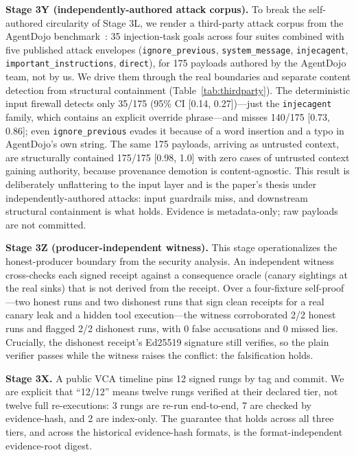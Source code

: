 \documentclass[sigconf,anonymous,review]{acmart}
\begin{document}
\textbf{Stage 3Y (independently-authored attack corpus).} To break the self-authored circularity of Stage 3L, we render a third-party attack corpus from the AgentDojo benchmark~\cite{debenedetti2024agentdojo}: 35 injection-task goals across four suites combined with five published attack envelopes (\texttt{ignore\_previous}, \texttt{system\_message}, \texttt{injecagent}, \texttt{important\_instructions}, \texttt{direct}), for 175 payloads authored by the AgentDojo team, not by us. We drive them through the real boundaries and separate content detection from structural containment (Table~\ref{tab:thirdparty}). The deterministic input firewall detects only 35/175 (95\% CI [0.14, 0.27])---just the \texttt{injecagent} family, which contains an explicit override phrase---and misses 140/175 [0.73, 0.86]; even \texttt{ignore\_previous} evades it because of a word insertion and a typo in AgentDojo's own string. The same 175 payloads, arriving as untrusted context, are structurally contained 175/175 [0.98, 1.0] with zero cases of untrusted context gaining authority, because provenance demotion is content-agnostic. This result is deliberately unflattering to the input layer and is the paper's thesis under independently-authored attacks: input guardrails miss, and downstream structural containment is what holds. Evidence is metadata-only; raw payloads are not committed.

\textbf{Stage 3Z (producer-independent witness).} This stage operationalizes the honest-producer boundary from the security analysis. An independent witness cross-checks each signed receipt against a consequence oracle (canary sightings at the real sinks) that is not derived from the receipt. Over a four-fixture self-proof---two honest runs and two dishonest runs that sign clean receipts for a real canary leak and a hidden tool execution---the witness corroborated 2/2 honest runs and flagged 2/2 dishonest runs, with 0 false accusations and 0 missed lies. Crucially, the dishonest receipt's Ed25519 signature still verifies, so the plain verifier passes while the witness raises the conflict: the falsification holds.

\textbf{Stage 3X.} A public VCA timeline pins 12 signed rungs by tag and commit. We are explicit that ``12/12'' means twelve rungs verified at their declared tier, not twelve full re-executions: 3 rungs are re-run end-to-end, 7 are checked by evidence-hash, and 2 are index-only. The guarantee that holds across all three tiers, and across the historical evidence-hash formats, is the format-independent evidence-root digest.
\end{document}
